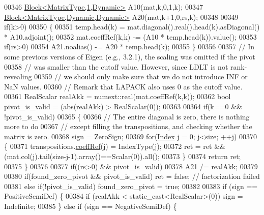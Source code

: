 \begin{DoxyCode}
00346       \hyperlink{group___core___module_class_eigen_1_1_block}{Block<MatrixType,1,Dynamic>} A10(mat,k,0,1,k);
00347       \hyperlink{group___core___module_class_eigen_1_1_block}{Block<MatrixType,Dynamic,Dynamic>} A20(mat,k+1,0,rs,k);
00348 
00349       \textcolor{keywordflow}{if}(k>0)
00350       \{
00351         temp.head(k) = mat.diagonal().real().head(k).asDiagonal() * A10.adjoint();
00352         mat.coeffRef(k,k) -= (A10 * temp.head(k)).value();
00353         \textcolor{keywordflow}{if}(rs>0)
00354           A21.noalias() -= A20 * temp.head(k);
00355       \}
00356 
00357       \textcolor{comment}{// In some previous versions of Eigen (e.g., 3.2.1), the scaling was omitted if the pivot}
00358       \textcolor{comment}{// was smaller than the cutoff value. However, since LDLT is not rank-revealing}
00359       \textcolor{comment}{// we should only make sure that we do not introduce INF or NaN values.}
00360       \textcolor{comment}{// Remark that LAPACK also uses 0 as the cutoff value.}
00361       RealScalar realAkk = numext::real(mat.coeffRef(k,k));
00362       \textcolor{keywordtype}{bool} pivot\_is\_valid = (abs(realAkk) > RealScalar(0));
00363 
00364       \textcolor{keywordflow}{if}(k==0 && !pivot\_is\_valid)
00365       \{
00366         \textcolor{comment}{// The entire diagonal is zero, there is nothing more to do}
00367         \textcolor{comment}{// except filling the transpositions, and checking whether the matrix is zero.}
00368         sign = ZeroSign;
00369         \textcolor{keywordflow}{for}(\hyperlink{group___cholesky___module_ad9c57eb2fb3bbccd51b9d2e111bea355}{Index} j = 0; j<size; ++j)
00370         \{
00371           transpositions.\hyperlink{class_eigen_1_1_transpositions_base_a97dda1bb4ff8bdd83d8e97af3e590252}{coeffRef}(j) = IndexType(j);
00372           ret = ret && (mat.col(j).tail(size-j-1).array()==Scalar(0)).all();
00373         \}
00374         \textcolor{keywordflow}{return} ret;
00375       \}
00376 
00377       \textcolor{keywordflow}{if}((rs>0) && pivot\_is\_valid)
00378         A21 /= realAkk;
00379 
00380       \textcolor{keywordflow}{if}(found\_zero\_pivot && pivot\_is\_valid) ret = \textcolor{keyword}{false}; \textcolor{comment}{// factorization failed}
00381       \textcolor{keywordflow}{else} \textcolor{keywordflow}{if}(!pivot\_is\_valid) found\_zero\_pivot = \textcolor{keyword}{true};
00382 
00383       \textcolor{keywordflow}{if} (sign == PositiveSemiDef) \{
00384         \textcolor{keywordflow}{if} (realAkk < static\_cast<RealScalar>(0)) sign = Indefinite;
00385       \} \textcolor{keywordflow}{else} \textcolor{keywordflow}{if} (sign == NegativeSemiDef) \{

\end{DoxyCode}
